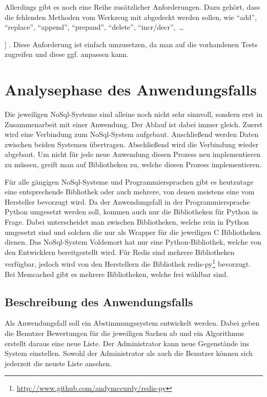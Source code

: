 Allerdings gibt es noch eine Reihe zusätzlicher Anforderungen. Dazu gehört,
dass die fehlenden Methoden vom Werkzeug mit abgedeckt werden sollen, wie
\enquote{add}, \enquote{replace}, \enquote{append}, \enquote{prepand},
\enquote{delete}, \enquote{incr/decr},~\dots{] . Diese Anforderung ist einfach
umzusetzen, da man auf die vorhandenen Tests zugreifen und diese ggf. anpassen
kann.

\section{Analysephase des Anwendungsfalls}
Die jeweiligen NoSql-Systeme sind alleine noch nicht sehr sinnvoll, sondern erst
in Zusammenarbeit mit einer Anwendung. Der Ablauf ist dabei immer gleich. Zuerst
wird eine Verbindung zum NoSql-System aufgebaut. Anschließend werden Daten
zwischen beiden Systemen übertragen. Abschließend wird die Verbindung wieder
abgebaut. Um nicht für jede neue Anwendung diesen Prozess neu implementieren zu
müssen, greift man auf Bibliotheken zu, welche diesen Prozess implementieren.

Für alle gängigen NoSql-Systeme und Programmiersprachen gibt es heutzutage eine
entsprechende Bibliothek oder auch mehrere, von denen meistens eine vom
Hersteller bevorzugt wird. Da der Anwendungsfall in der Programmiersprache
Python umgesetzt werden soll, kommen auch nur die Bibliotheken für Python in
Frage. Dabei unterscheidet man zwischen Bibliotheken, welche rein in Python
umgesetzt sind und solchen die nur als Wrapper für die jeweiligen C Bibliotheken
dienen. Das NoSql-System Voldemort hat nur eine Python-Bibliothek, welche von
den Entwicklern bereitgestellt wird. Für Redis sind mehrere Bibliotheken
verfügbar, jedoch wird von den Herstellern die Bibliothek
redis-py\footnote{\url{http://www.github.com/andymccurdy/redis-py}} bevorzugt.
Bei Memcached gibt es mehrere Bibliotheken, welche frei wählbar sind.

\subsection{Beschreibung des Anwendungsfalls}
Als Anwendungsfall soll ein Abstimmungssystem entwickelt werden. Dabei geben
die Benutzer Bewertungen für die jeweiligen Sachen ab und ein Algorithmus
erstellt daraus eine neue Liste. Der Administrator kann neue Gegenstände ins
System einstellen. Sowohl der Administrator als auch die Benutzer können sich
jederzeit die neuste Liste ansehen.

}
